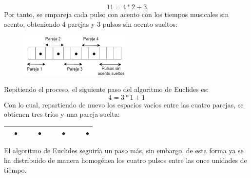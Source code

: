 \documentclass[a4paper, openright, 11pt, titlepage]{report}
\theoremstyle{definition}\newtheorem{defin}[propo]{Definition}
\theoremstyle{definition}\newtheorem{obser}[propo]{Remark}
\theoremstyle{definition}\newtheorem{ejem}[propo]{Ejemplo}
\theoremstyle{definition}\newtheorem{algoritmo}[propo]{Algoritmo}
\begin{document}
$$11 = \boxed{4}*2 + \boxed{3}$$
Por tanto, se empareja cada pulso con acento con los tiempos musicales sin acento, obteniendo 4 parejas y 3 pulsos sin acento sueltos:
\begin{figure}[H]
    \centering
    \includegraphics[width = 0.5\textwidth]{pulsos.png}
\end{figure}
Repitiendo el proceso, el siguiente paso del algoritmo de Euclides es:
$$4 = \boxed{3}*1 + \boxed{1}$$
Con lo cual, repartiendo de nuevo los espacios vacíos entre las cuatro parejas, se obtienen tres tríos y una pareja suelta:
\begin{table}[H]
    \centering
    \begin{tabular}{|c|c|c|c|c|c|c|c|c|c|c|}
    \hline
         & $\bullet$ & & & $\bullet$ & & &$\bullet$ & & &$\bullet$\\
        \hline
    \end{tabular}
\end{table}
El algoritmo de Euclides seguiría un paso más, sin embargo, de esta forma ya se ha distribuido de manera homogénea los cuatro pulsos entre las once unidades de tiempo.\\\\
\end{document}
